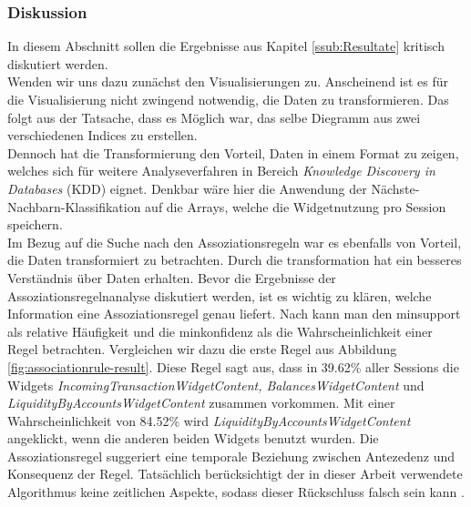 \subsubsection{Diskussion}
\label{ssub:Diskussion}
In diesem Abschnitt sollen die Ergebnisse aus Kapitel \ref{ssub:Resultate} kritisch diskutiert werden.\\
Wenden wir uns dazu zunächst den Visualisierungen zu. Anscheinend ist es für die Visualisierung nicht zwingend notwendig, die Daten zu transformieren. Das folgt aus der Tatsache, dass es Möglich war, das selbe Diegramm aus zwei verschiedenen Indices zu erstellen.\\
Dennoch hat die Transformierung den Vorteil, Daten in einem Format zu zeigen, welches sich für weitere Analyseverfahren in Bereich \textit{Knowledge Discovery in Databases} (KDD) eignet. Denkbar wäre hier die Anwendung der Nächste-Nachbarn-Klassifikation \citep{EsSa00} auf die Arrays, welche die Widgetnutzung pro Session speichern.\\
Im Bezug auf die Suche nach den Assoziationsregeln war es ebenfalls von Vorteil, die Daten transformiert zu betrachten. Durch die transformation hat ein besseres Verständnis über Daten erhalten.
\newline
Bevor die Ergebnisse der Assoziationsregelnanalyse diskutiert werden, ist es wichtig zu klären, welche Information eine Assoziationsregel genau liefert. Nach \citet{BeKe19} kann man den minsupport als relative Häufigkeit und die minkonfidenz als die Wahrscheinlichkeit einer Regel betrachten. Vergleichen wir dazu die erste Regel aus Abbildung \ref{fig:associationrule-result}. Diese Regel sagt aus, dass in 39.62\% aller Sessions die Widgets \textit{IncomingTransactionWidgetContent, BalancesWidgetContent} und \textit{LiquidityByAccountsWidgetContent} zusammen vorkommen. Mit einer Wahrscheinlichkeit von 84.52\% wird \textit{LiquidityByAccountsWidgetContent} angeklickt, wenn die anderen beiden Widgets benutzt wurden. Die Assoziationsregel suggeriert eine temporale Beziehung zwischen Antezedenz und Konsequenz der Regel. Tatsächlich berücksichtigt der in dieser Arbeit verwendete Algorithmus keine zeitlichen Aspekte, sodass dieser Rückschluss falsch sein kann \citep{Be03}.\\
